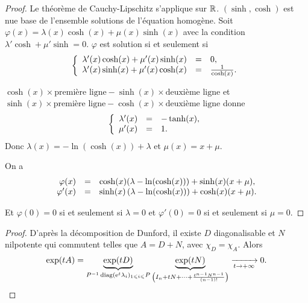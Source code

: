 \documentclass[12pt]{article}
\begin{document}
\begin{proof}
	Le théorème de Cauchy-Lipschitz s'applique sur $\mathbb{R}$. $(\sinh,\cosh)$ est nue base de l'ensemble solutions de l'équation homogène. Soit $\varphi(x)=\lambda(x)\cosh(x)+\mu(x)\sinh(x)$ avec la condition $\lambda'\cosh+\mu'\sinh=0$. $\varphi$ est solution si et seulement si 
	\begin{equation}
		\left\lbrace
			\begin{array}[]{rcl}
				\lambda'(x)\cosh(x)+\mu'(x)\sinh(x) &=&0,\\
				\lambda'(x)\sinh(x)+\mu'(x)\cosh(x) &=&\frac{1}{\cosh(x)}.
			\end{array}
		\right.
	\end{equation}

	$\cosh(x)\times\text{première ligne}-\sinh(x)\times\text{deuxième ligne}$ et $\sinh(x)\times\text{première ligne}-\cosh(x)\times\text{deuxième ligne}$ donne 
	\begin{equation}
		\left\lbrace
			\begin{array}[]{rcl}
				\lambda'(x) &=& -\tanh(x),\\
				\mu'(x) &=& 1.
			\end{array}
		\right.
	\end{equation}
	Donc $\lambda(x)=-\ln(\cosh(x))+\lambda$ et $\mu(x)=x+\mu$.

	On a 
	\begin{equation}
		\begin{array}[]{rcl}
			\varphi(x) &=& \cosh(x)(\lambda-\ln(\cosh(x)))+\sinh(x)(x+\mu),\\
			\varphi'(x) &=& \sinh(x)\left(\lambda-\ln(\cosh(x))\right)+\cosh(x)(x+\mu).
		\end{array}
	\end{equation}

	Et $\varphi(0)=0$ si et seulement si $\lambda=0$ et $\varphi'(0)=0$ si et seulement si $\mu=0$.
\end{proof}

\begin{proof}
	D'après la décomposition de Dunford, il existe $D$ diagonalisable et $N$ nilpotente qui commutent telles que $A=D+N$, avec $\chi_{D}=\chi_{A}$.
	Alors 
	\begin{equation}
		\exp(tA)=\underbrace{\exp(tD)}_{P^{-1}\operatorname{diag}(\mathrm{e}^{t}\lambda_i)_{1\leqslant i\leqslant}P}\underbrace{\exp(tN)}_{\left(I_n+tN+\dots+\frac{t^{n-1}N^{n-1}}{(n-1)!}\right)}\xrightarrow[t\to+\infty]{}0.
	\end{equation}
\end{proof}
\end{document}
